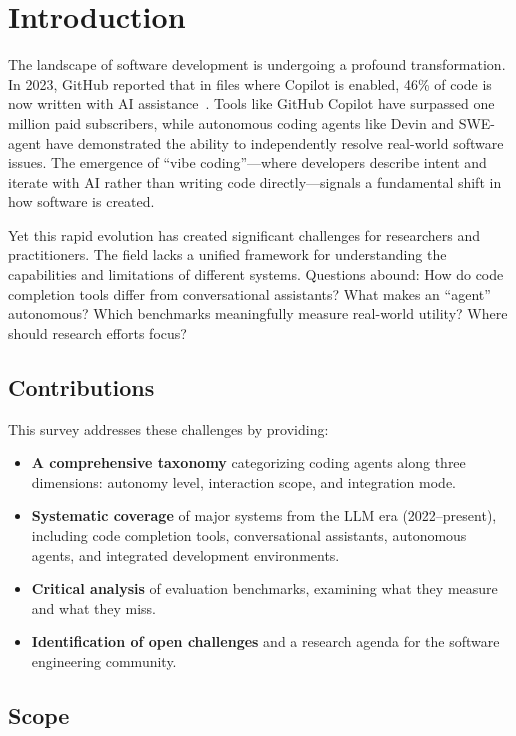 \section{Introduction}
\label{sec:introduction}

The landscape of software development is undergoing a profound transformation. In 2023, GitHub reported that in files where Copilot is enabled, 46\% of code is now written with AI assistance~\citep{github2023copilot}. Tools like GitHub Copilot have surpassed one million paid subscribers, while autonomous coding agents like Devin and SWE-agent have demonstrated the ability to independently resolve real-world software issues. The emergence of ``vibe coding''---where developers describe intent and iterate with AI rather than writing code directly---signals a fundamental shift in how software is created.

Yet this rapid evolution has created significant challenges for researchers and practitioners. The field lacks a unified framework for understanding the capabilities and limitations of different systems. Questions abound: How do code completion tools differ from conversational assistants? What makes an ``agent'' autonomous? Which benchmarks meaningfully measure real-world utility? Where should research efforts focus?

\subsection{Contributions}

This survey addresses these challenges by providing:

\begin{itemize}
    \item \textbf{A comprehensive taxonomy} categorizing coding agents along three dimensions: autonomy level, interaction scope, and integration mode.
    \item \textbf{Systematic coverage} of major systems from the LLM era (2022--present), including code completion tools, conversational assistants, autonomous agents, and integrated development environments.
    \item \textbf{Critical analysis} of evaluation benchmarks, examining what they measure and what they miss.
    \item \textbf{Identification of open challenges} and a research agenda for the software engineering community.
\end{itemize}

\subsection{Scope}

